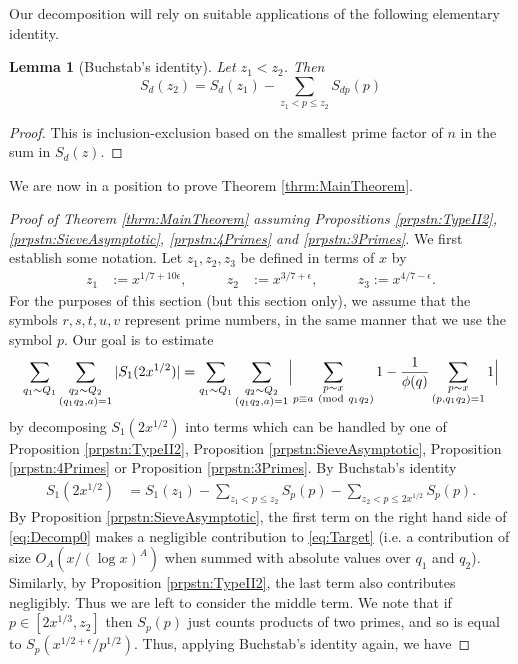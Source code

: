 \documentclass[10pt]{amsart}
\theoremstyle{plain}
\newtheorem{lmm}[thrm]{Lemma}
\numberwithin{equation}{section}
\newcommand{\Mod}[1]{\ (\mathrm{mod}\ #1)}
\begin{document}
Our decomposition will rely on suitable applications of the following elementary identity.
%
%
%
%
%
%
%
%
\begin{lmm}[Buchstab's identity]
Let $z_1<z_2$. Then
\[
S_d(z_2)=S_d(z_1)-\sum_{z_1<p\le z_2}S_{d p}(p)
\]
\end{lmm}
%
%
%
%
\begin{proof}
This is inclusion-exclusion based on the smallest prime factor of $n$ in the sum in $S_d(z)$.
\end{proof}
%
%
%
%
%
%
%
%
We are now in a position to prove Theorem \ref{thrm:MainTheorem}.
%
%
%
%
%
%
%
%
\begin{proof}[Proof of Theorem \ref{thrm:MainTheorem} assuming Propositions \ref{prpstn:TypeII2}, \ref{prpstn:SieveAsymptotic}, \ref{prpstn:4Primes} and \ref{prpstn:3Primes}]
We first establish some notation. Let $z_1,z_2,z_3$ be defined in terms of $x$ by
\begin{align*}
z_1&:= x^{1/7+10\epsilon},&\qquad z_2&:=x^{3/7+\epsilon},&\qquad z_3:=x^{4/7-\epsilon}.
\end{align*}
For the purposes of this section (but this section only), we assume that the symbols $r,s,t,u,v$ represent prime numbers, in the same manner that we use the symbol $p$. 
Our goal is to estimate
\begin{equation}
\sum_{q_1\sim Q_1}\sum_{\substack{q_2\sim Q_2\\ (q_1q_2,a)=1}}|S_1(2x^{1/2})|=\sum_{q_1\sim Q_1}\sum_{\substack{q_2\sim Q_2\\ (q_1q_2,a)=1}}\Bigl|\sum_{\substack{p\sim x\\ p\equiv a\Mod{q_1q_2}}}1-\frac{1}{\phi(q)}\sum_{\substack{p\sim x\\ (p,q_1q_2)=1}}1\Bigr|
\label{eq:Target}
\end{equation}
by decomposing $S_1(2x^{1/2})$ into terms which can be handled by one of Proposition \ref{prpstn:TypeII2}, Proposition \ref{prpstn:SieveAsymptotic}, Proposition \ref{prpstn:4Primes} or Proposition \ref{prpstn:3Primes}. 
%
By Buchstab's identity
\begin{align}
S_1(2x^{1/2})&=S_1(z_1)-\sum_{z_1< p\le z_2}S_p(p)-\sum_{z_2< p\le 2x^{1/2}}S_p(p).\label{eq:Decomp0}
\end{align}
By Proposition \ref{prpstn:SieveAsymptotic}, the first term on the right hand side of \eqref{eq:Decomp0} makes a negligible contribution to \eqref{eq:Target} (i.e. a contribution of size $O_{A}(x/(\log{x})^A)$ when summed with absolute values over $q_1$ and $q_2$). Similarly, by Proposition \ref{prpstn:TypeII2}, the last term also contributes negligibly. Thus we are left to consider the middle term. We note that if $p\in[2x^{1/3},z_2]$ then $S_p(p)$ just counts products of two primes, and so is equal to $S_p(x^{1/2+\epsilon}/p^{1/2})$. Thus, applying Buchstab's identity again, we have

\end{proof}
\end{document}
